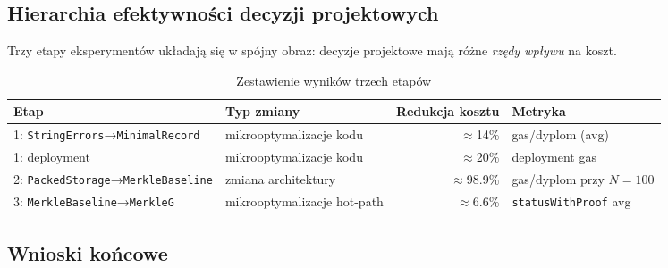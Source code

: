 \documentclass[11pt,a4paper]{article}
\begin{document}
\subsection{Hierarchia efektywności decyzji projektowych}

Trzy etapy eksperymentów układają się w spójny obraz:
decyzje projektowe mają różne \emph{rzędy wpływu} na koszt.

\begin{table}[H]
\centering
\caption{Zestawienie wyników trzech etapów}
\begin{tabular}{llrl}
\toprule
Etap & Typ zmiany & Redukcja kosztu & Metryka \\
\midrule
1: \texttt{StringErrors}→\texttt{MinimalRecord} & mikrooptymalizacje kodu   & $\approx$14\%     & gas/dyplom (avg) \\
1: deployment                                    & mikrooptymalizacje kodu   & $\approx$20\%     & deployment gas \\
2: \texttt{PackedStorage}→\texttt{MerkleBaseline} & zmiana architektury      & $\approx$98.9\%   & gas/dyplom przy $N=100$ \\
3: \texttt{MerkleBaseline}→\texttt{MerkleG}       & mikrooptymalizacje hot-path & $\approx$6.6\%  & \texttt{statusWithProof} avg \\
\bottomrule
\end{tabular}
\end{table}

\subsection{Wnioski końcowe}
\end{document}
